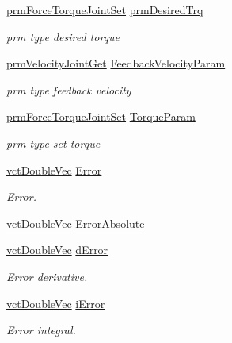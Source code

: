 \begin{DoxyCompactItemize}
\hyperlink{classprm_force_torque_joint_set}{prm\+Force\+Torque\+Joint\+Set} \hyperlink{classmts_p_i_d_a6be58279848adac1f3612c320cf182ea}{prm\+Desired\+Trq}
\begin{DoxyCompactList}\small\item\em prm type desired torque \end{DoxyCompactList}\item 
\hyperlink{classprm_velocity_joint_get}{prm\+Velocity\+Joint\+Get} \hyperlink{classmts_p_i_d_aeeab33b51fd3b843ac969d8e15ec0d8a}{Feedback\+Velocity\+Param}
\begin{DoxyCompactList}\small\item\em prm type feedback velocity \end{DoxyCompactList}\item 
\hyperlink{classprm_force_torque_joint_set}{prm\+Force\+Torque\+Joint\+Set} \hyperlink{classmts_p_i_d_a5aab0504bce1d2293bfbbc2eeec3f1f9}{Torque\+Param}
\begin{DoxyCompactList}\small\item\em prm type set torque \end{DoxyCompactList}\item 
\hyperlink{vct_dynamic_vector_types_8h_ade4b3068c86fb88f41af2e5187e491c2}{vct\+Double\+Vec} \hyperlink{classmts_p_i_d_a48747e1fcd6e96164d925b8803105697}{Error}
\begin{DoxyCompactList}\small\item\em Error. \end{DoxyCompactList}\item 
\hyperlink{vct_dynamic_vector_types_8h_ade4b3068c86fb88f41af2e5187e491c2}{vct\+Double\+Vec} \hyperlink{classmts_p_i_d_abeb97a2bb603ecbe4636063effb6bf90}{Error\+Absolute}
\item 
\hyperlink{vct_dynamic_vector_types_8h_ade4b3068c86fb88f41af2e5187e491c2}{vct\+Double\+Vec} \hyperlink{classmts_p_i_d_ae171fb161398be9d69e7e647625c6cd6}{d\+Error}
\begin{DoxyCompactList}\small\item\em Error derivative. \end{DoxyCompactList}\item 
\hyperlink{vct_dynamic_vector_types_8h_ade4b3068c86fb88f41af2e5187e491c2}{vct\+Double\+Vec} \hyperlink{classmts_p_i_d_a89f471bbc0cb21cc9c64552a087c1a2c}{i\+Error}
\begin{DoxyCompactList}\small\item\em Error integral. \end{DoxyCompactList}\item 

\end{DoxyCompactItemize}
